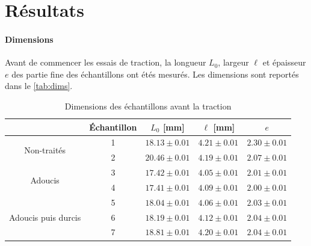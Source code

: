 \section{Résultats}

\paragraph{Dimensions} Avant de commencer les essais de traction, la longueur \(L_0\), largeur \(\ell\) et épaisseur \(e\) des partie fine des échantillons ont étés mesurés. Les dimensions sont reportés dans le \autoref{tab:dims}.

\begin{table}[h]
    \centering
    \begin{tabular}{ |c||c|c|c|c| }
        \cline{2-5}
        \multicolumn{1}{c|}{} & Échantillon & \(L_0\) [mm] & \(\ell\) [mm] & \(e\) \\
        \hline
        \multirow{2}{3cm}{Non-traités} & 1 & \(18.13 \pm 0.01\) & \(4.21 \pm 0.01\) & \(2.30 \pm 0.01\) \\
        & 2 & \(20.46 \pm 0.01\) & \(4.19 \pm 0.01\) & \(2.07 \pm 0.01\) \\
        \hline
        \multirow{2}{3cm}{Adoucis} & 3 & \(17.42 \pm 0.01\) & \(4.05 \pm 0.01\) & \(2.01 \pm 0.01\) \\
        & 4 & \(17.41 \pm 0.01\) & \(4.09 \pm 0.01\) & \(2.00 \pm 0.01\) \\
        \hline
        \multirow{3}{3cm}{Adoucis puis durcis} & 5 & \(18.04 \pm 0.01\) & \(4.06 \pm 0.01\) & \(2.03 \pm 0.01\) \\
        & 6 & \(18.19 \pm 0.01\) & \(4.12 \pm 0.01\) & \(2.04 \pm 0.01\) \\
        & 7 & \(18.81 \pm 0.01\) & \(4.20 \pm 0.01\) & \(2.04 \pm 0.01\) \\
        \hline
    \end{tabular}
    \caption{Dimensions des échantillons avant la traction}
    \label{tab:dims}
\end{table}

